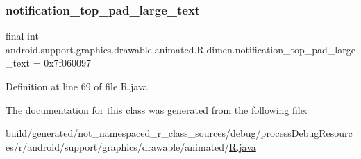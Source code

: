 \subsubsection{\texorpdfstring{notification\_top\_pad\_large\_text}{notification\_top\_pad\_large\_text}}
{\footnotesize\ttfamily final int android.\+support.\+graphics.\+drawable.\+animated.\+R.\+dimen.\+notification\+\_\+top\+\_\+pad\+\_\+large\+\_\+text = 0x7f060097\hspace{0.3cm}{\ttfamily [static]}}



Definition at line 69 of file R.\+java.



The documentation for this class was generated from the following file\+:\begin{DoxyCompactItemize}
\item 
build/generated/not\+\_\+namespaced\+\_\+r\+\_\+class\+\_\+sources/debug/process\+Debug\+Resources/r/android/support/graphics/drawable/animated/\mbox{\hyperlink{android_2support_2graphics_2drawable_2animated_2_r_8java}{R.\+java}}\end{DoxyCompactItemize}
